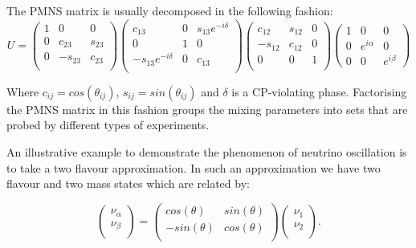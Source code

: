 The PMNS matrix is usually decomposed in the following fashion:
\begin{equation}
  U = 
  \begin{pmatrix}
    1 & 0 & 0 \\
    0 & c_{23} & s_{23} \\
    0 & -s_{23} & c_{23} \\
  \end{pmatrix}
  \begin{pmatrix}
    c_{13} & 0 & s_{13}e^{-i\delta} \\
    0 & 1 & 0 \\
    -s_{13}e^{-i\delta} & 0 & c_{13} \\
  \end{pmatrix}
  \begin{pmatrix}
    c_{12} & s_{12} & 0 \\
    -s_{12} & c_{12} & 0 \\
    0 & 0 & 1 \\
  \end{pmatrix}
  \begin{pmatrix}
    1 & 0 & 0 \\
    0 & e^{i\alpha} & 0 \\
    0 & 0 & e^{i\beta} 
  \end{pmatrix}
  \label{eq:particle-physics:pmns_matrix}
\end{equation}

\noindent
Where $c_{ij}=cos(\theta_{ij})$, $s_{ij}=sin(\theta_{ij})$ and $\delta$ is a CP-violating phase. Factorising the PMNS matrix in this fashion groups the mixing parameters into sets that are probed by different types of experiments. 

An illustrative example to demonstrate the phenomenon of neutrino oscillation is to take a two flavour approximation. In such an approximation we have two flavour and two mass states which are related by:

\begin{equation}
  \begin{pmatrix}
    \nu_{\alpha} \\
    \nu_{\beta} \\
  \end{pmatrix}
  =
  \begin{pmatrix}
    cos(\theta) & sin(\theta) \\
    -sin(\theta) & cos(\theta) \\
  \end{pmatrix}
  \begin{pmatrix}
    \nu_{1} \\
    \nu_{2} \\
  \end{pmatrix}.
  \label{eq:particle-physics:neutrino-oscillation-two-flavour}
\end{equation}

